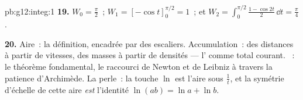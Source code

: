 \begin{solution}{pb:g12:integ:1}
\textbf{19.} $W_0 = \frac\pi2$~; $W_1 = \left[-\cos
t\right]_0^{\pi/2} = 1$~; et
$W_2 = \int_0^{\pi/2} \frac{1 - \cos 2t}{2}\,\dd t = \frac\pi4$.

\textbf{20.} Aire~: la définition, encadrée par des escaliers.
Accumulation~: des distances à partir de vitesses, des masses à
partir de densités --- l' comme total courant. ~:
le théorème fondamental, le raccourci de Newton et de Leibniz à
travers la patience d'Archimède. La perle~: la touche $\ln$ est
l'aire sous $\frac1t$, et la symétrie d'échelle de cette aire
\emph{est} l'identité $\ln(ab) = \ln a + \ln b$.
\end{solution}
